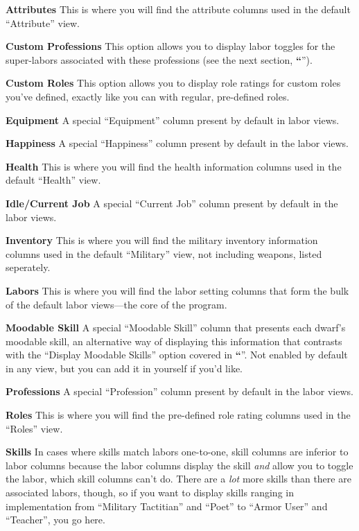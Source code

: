 \documentclass[]{article}
\newcommand{\jump}[1] {\textbf{``\nameref{sec:#1}}''}
\newcommand{\boldlist}[1] {
\vspace{12pt}
\noindent \textbf{#1}
}
\begin{document}
\boldlist{Attributes} This is where you will find the attribute columns used in the default
``Attribute'' view.

\boldlist{Custom Professions} This option allows you to display labor toggles for the super-labors
associated with these professions (see the next section, \jump{Super Labors}).

\boldlist{Custom Roles} This option allows you to display role ratings for custom roles you've defined,
exactly like you can with regular, pre-defined roles.

\boldlist{Equipment} A special ``Equipment'' column present by default in labor views.

\boldlist{Happiness} A special ``Happiness'' column present by default in the labor views.

\boldlist{Health} This is where you will find the health information columns used in the
default ``Health'' view.

\boldlist{Idle/Current Job} A special ``Current Job'' column present by default in the labor
views.

\boldlist{Inventory} This is where you will find the military inventory information columns used
in the default ``Military'' view, not including weapons, listed seperately.

\boldlist{Labors} This is where you will find the labor setting columns that form the bulk of the default
labor views---the core of the program.

\boldlist{Moodable Skill} A special ``Moodable Skill'' column that presents each dwarf's moodable skill,
an alternative way of displaying this information that contrasts with the ``Display Moodable Skills''
option covered in \jump{Options}. Not enabled by default in any view, but you can add it in yourself if
you'd like.

\boldlist{Professions} A special ``Profession'' column present by default in the labor views.

\boldlist{Roles} This is where you will find the pre-defined role rating columns used in the ``Roles''
view.

\boldlist{Skills} In cases where skills match labors one-to-one, skill columns are inferior to labor
columns because the labor columns display the skill \emph{and} allow you to toggle the labor, which
skill columns can't do. There are a \emph{lot} more skills than there are associated labors, though, so
if you want to display skills ranging in implementation from ``Military Tactitian'' and ``Poet'' to
``Armor User'' and ``Teacher'', you go here.
\end{document}
